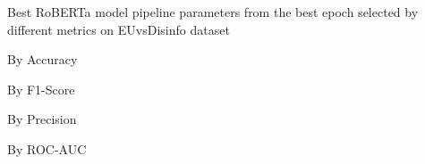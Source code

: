 \begin{table}[!htbp]
    \caption{Best RoBERTa model pipeline parameters from the best epoch selected by different metrics on EUvsDisinfo dataset}
    \label{tab:euvsdisinfo_roberta_pipeline_params}
    \centering

    \begin{subtable}[t]{0.48\linewidth}
        \scriptsize
        \caption{By Accuracy}
        
    \end{subtable}
    \hfill
    \begin{subtable}[t]{0.48\linewidth}
        \scriptsize
        \caption{By F1-Score}
        
    \end{subtable}

    \vspace{1em}

    \begin{subtable}[t]{0.48\linewidth}
        \scriptsize
        \caption{By Precision}
        
    \end{subtable}
    \hfill
    \begin{subtable}[t]{0.48\linewidth}
        \scriptsize
        \caption{By ROC-AUC}
        
    \end{subtable}

\end{table}